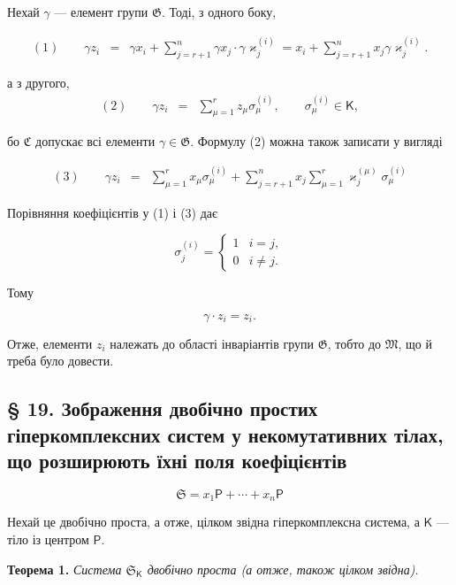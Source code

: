 \documentclass[11pt]{article}
\begin{document}
Нехай \(\gamma\) --- елемент групи \(\mathfrak G\). Тоді, з одного боку,

\[
\begin{array}{rcl}
(1)\qquad \gamma z_i
&=&\gamma x_i+\displaystyle\sum_{j=r+1}^{n}\gamma x_j\cdot \gamma\varkappa_j^{(i)}
=x_i+\displaystyle\sum_{j=r+1}^{n}x_j\gamma\varkappa_j^{(i)}.
\end{array}
\]

а з другого,
\[
\begin{array}{rcl}
(2)\qquad \gamma z_i&=&\displaystyle\sum_{\mu=1}^{r}z_\mu\sigma_\mu^{(i)},
\qquad \sigma_\mu^{(i)}\in\mathsf K,
\end{array}
\]

бо \(\mathfrak C\) допускає всі елементи \(\gamma\in\mathfrak G\). Формулу (2) можна також записати у вигляді

\[
\begin{array}{rcl}
(3)\qquad \gamma z_i
&=&\displaystyle\sum_{\mu=1}^{r}x_\mu\sigma_\mu^{(i)}
+\displaystyle\sum_{j=r+1}^{n}x_j\sum_{\mu=1}^{r}\varkappa_j^{(\mu)}\sigma_\mu^{(i)}
\end{array}
\]

Порівняння коефіцієнтів у (1) і (3) дає

\[
\sigma_j^{(i)}=
\begin{cases}
1 & i=j,\\
0 & i\ne j.
\end{cases}
\]

Тому

\[
\gamma\cdot z_i=z_i.
\]

Отже, елементи \(z_i\) належать до області інваріантів групи \(\mathfrak G\), тобто до \(\mathfrak M\), що й треба було довести.

\subsection*{§ 19. Зображення двобічно простих гіперкомплексних систем у некомутативних тілах, що розширюють їхні поля коефіцієнтів}\label{darstellungen-zweiseitig-einfacher-hyperkomplexer-systeme-in-nichtkommutativen-erweiterungskoerpern-ihrer-koeffizientenkoerper}

\[
\mathfrak S=x_1\mathsf P+\cdots+x_n\mathsf P
\]

Нехай це двобічно проста, а отже, цілком звідна гіперкомплексна система, а \(\mathsf K\) --- тіло із центром \(\mathsf P\).

\textbf{Теорема 1.} \emph{Система \(\mathfrak S_{\mathsf K}\) двобічно проста (а отже, також цілком звідна).}
\end{document}
